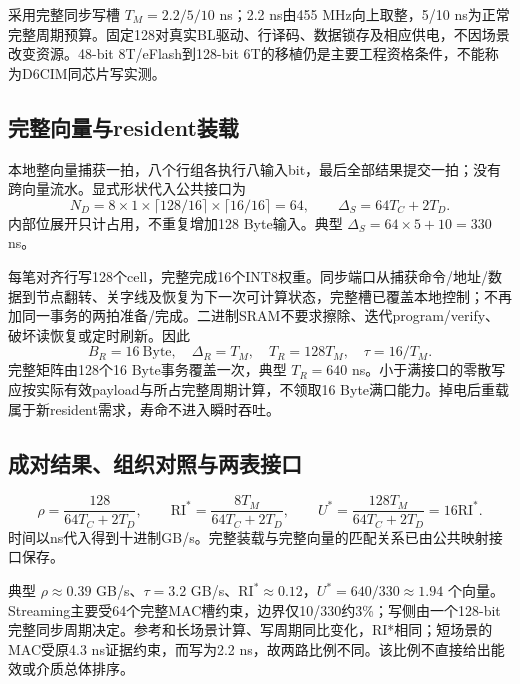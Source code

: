 采用完整同步写槽 $T_M=2.2/5/10$ ns；2.2 ns由455 MHz向上取整，5/10 ns为正常完整周期预算。固定128对真实BL驱动、行译码、数据锁存及相应供电，不因场景改变资源。48-bit 8T/eFlash到128-bit 6T的移植仍是主要工程资格条件，不能称为D6CIM同芯片写实测。

\subsection{完整向量与resident装载}

本地整向量捕获一拍，八个行组各执行八输入bit，最后全部结果提交一拍；没有跨向量流水。显式形状代入公共接口为
\begin{equation}
N_D=8\times1\times\lceil128/16\rceil\times\lceil16/16\rceil=64,
\qquad\Delta_S=64T_C+2T_D.
\label{02_sram_dcim:eq:dcim-local-stream}
\end{equation}
内部位展开只计占用，不重复增加128 Byte输入。典型 $\Delta_S=64\times5+10=330$ ns。

每笔对齐行写128个cell，完整完成16个INT8权重。同步端口从捕获命令/地址/数据到节点翻转、关字线及恢复为下一次可计算状态，完整槽已覆盖本地控制；不再加同一事务的两拍准备/完成。二进制SRAM不要求擦除、迭代program/verify、破坏读恢复或定时刷新。因此
\begin{equation}
B_R=16\ \mathrm{Byte},\quad\Delta_R=T_M,\quad
T_R=128T_M,\quad\tau=16/T_M.
\label{02_sram_dcim:eq:dcim-local-resident}
\end{equation}
完整矩阵由128个16 Byte事务覆盖一次，典型 $T_R=640$ ns。小于满接口的零散写应按实际有效payload与所占完整周期计算，不领取16 Byte满口能力。掉电后重载属于新resident需求，寿命不进入瞬时吞吐。

\subsection{成对结果、组织对照与两表接口}

\begin{equation}
\rho=\frac{128}{64T_C+2T_D},\qquad
\mathrm{RI}^*=\frac{8T_M}{64T_C+2T_D},\qquad
U^*=\frac{128T_M}{64T_C+2T_D}=16\mathrm{RI}^*.
\label{02_sram_dcim:eq:dcim-local-ridge}
\end{equation}
时间以ns代入得到十进制GB/s。完整装载与完整向量的匹配关系已由公共映射接口保存。



典型 $\rho\approx0.39$ GB/s、$\tau=3.2$ GB/s、$\mathrm{RI}^*\approx0.12$，$U^*=640/330\approx1.94$ 个向量。Streaming主要受64个完整MAC槽约束，边界仅10/330约3\%；写侧由一个128-bit完整同步周期决定。参考和长场景计算、写周期同比变化，RI*相同；短场景的MAC受原4.3 ns证据约束，而写为2.2 ns，故两路比例不同。该比例不直接给出能效或介质总体排序。

